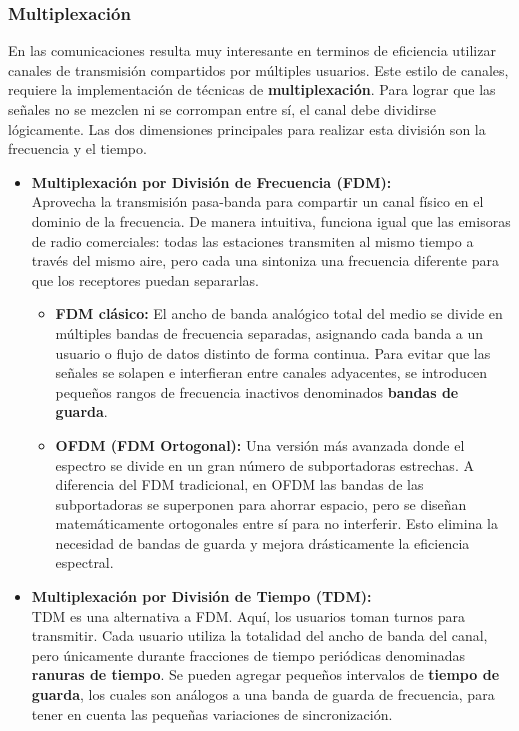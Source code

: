 \subsubsection{Multiplexación}

En las comunicaciones resulta muy interesante en terminos de eficiencia utilizar canales de transmisión compartidos por múltiples usuarios. Este estilo de canales, requiere la implementación de técnicas de \textbf{multiplexación}. Para lograr que las señales no se mezclen ni se corrompan entre sí, el canal debe dividirse lógicamente. Las dos dimensiones principales para realizar esta división son la frecuencia y el tiempo.

\begin{itemize}
  \item \textbf{Multiplexación por División de Frecuencia (FDM):}\\
  Aprovecha la transmisión pasa-banda para compartir un canal físico en el dominio de la frecuencia. De manera intuitiva, funciona igual que las emisoras de radio comerciales: todas las estaciones transmiten al mismo tiempo a través del mismo aire, pero cada una sintoniza una frecuencia diferente para que los receptores puedan separarlas.
  \begin{itemize}
    \item \textbf{FDM clásico:} El ancho de banda analógico total del medio se divide en múltiples bandas de frecuencia separadas, asignando cada banda a un usuario o flujo de datos distinto de forma continua. Para evitar que las señales se solapen e interfieran entre canales adyacentes, se introducen pequeños rangos de frecuencia inactivos denominados \textbf{bandas de guarda}.
    \item \textbf{OFDM (FDM Ortogonal):} Una versión más avanzada donde el espectro se divide en un gran número de subportadoras estrechas. A diferencia del FDM tradicional, en OFDM las bandas de las subportadoras se superponen para ahorrar espacio, pero se diseñan matemáticamente ortogonales entre sí para no interferir. Esto elimina la necesidad de bandas de guarda y mejora drásticamente la eficiencia espectral.
  \end{itemize}

  \item \textbf{Multiplexación por División de Tiempo (TDM):}\\
  TDM es una alternativa a FDM. Aquí, los usuarios toman turnos para transmitir. Cada usuario utiliza la totalidad del ancho de banda del canal, pero únicamente durante fracciones de tiempo periódicas denominadas \textbf{ranuras de tiempo}. Se pueden agregar pequeños intervalos de \textbf{tiempo de guarda}, los cuales son análogos a una banda de guarda de frecuencia, para tener en cuenta las pequeñas variaciones de sincronización.
\end{itemize}

